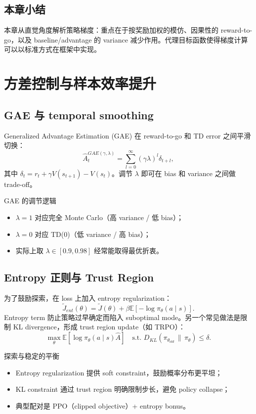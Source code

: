 \documentclass[a4paper]{article}
\begin{document}
\subsection{本章小结}

本章从直觉角度解析策略梯度：重点在于按奖励加权的模仿、因果性的 reward-to-go，以及 baseline/advantage 的 variance 减少作用。代理目标函数使得梯度计算可以以标准方式在框架中实现。

\section{方差控制与样本效率提升}
\subsection{GAE 与 temporal smoothing}
Generalized Advantage Estimation (GAE) 在 reward-to-go 和 TD error 之间平滑切换：
$$\hat{A}_t^{GAE(\gamma,\lambda)} = \sum_{l=0}^{\infty}(\gamma\lambda)^l \delta_{t+l},$$
其中 $\delta_t = r_t + \gamma V(s_{t+1}) - V(s_t)$。调节 $\lambda$ 即可在 bias 和 variance 之间做 trade-off。

\begin{importantbox}{GAE 的调节逻辑}
\begin{itemize}
    \item $\lambda=1$ 对应完全 Monte Carlo（高 variance / 低 bias）；
    \item $\lambda=0$ 对应 TD(0)（低 variance / 高 bias）；
    \item 实际上取 $\lambda \in [0.9,0.98]$ 经常能取得最优折衷。
\end{itemize}
\end{importantbox}

\subsection{Entropy 正则与 Trust Region}
为了鼓励探索，在 loss 上加入 entropy regularization：
$$\tilde{J}_{ent}(\theta) = \tilde{J}(\theta) + \beta \mathbb{E}[-\log \pi_\theta(a\mid s)].$$
Entropy term 防止策略过早确定而陷入 suboptimal mode。另一个常见做法是限制 KL divergence，形成 trust region update（如 TRPO）：
$$\max_\theta \mathbb{E}[\log \pi_\theta(a\mid s) \hat{A}] \quad \text{s.t. } D_{KL}(\pi_{\theta_{old}} \,\|\, \pi_\theta) \le \delta.$$

\begin{knowledgebox}{探索与稳定的平衡}
\begin{itemize}
    \item Entropy regularization 提供 soft constraint，鼓励概率分布更平坦；
    \item KL constraint 通过 trust region 明确限制步长，避免 policy collapse；
    \item 典型配对是 PPO（clipped objective）+ entropy bonus。
\end{itemize}
\end{knowledgebox}
\end{document}
